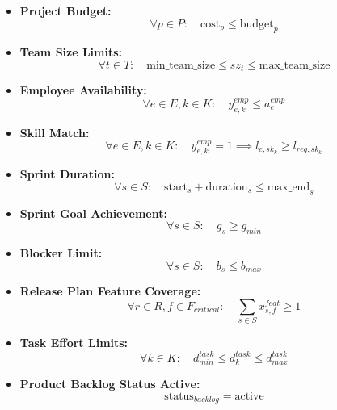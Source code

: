 \documentclass{article}
\begin{document}
\begin{itemize}
\item \textbf{Project Budget:}
\[
\forall p \in P: \quad \text{cost}_p \leq \text{budget}_p
\]

\item \textbf{Team Size Limits:}
\[
\forall t \in T: \quad \text{min\_team\_size} \leq sz_t \leq \text{max\_team\_size}
\]

\item \textbf{Employee Availability:}
\[
\forall e \in E, k \in K: \quad y^{emp}_{e,k} \leq a^{emp}_e
\]

\item \textbf{Skill Match:}
\[
\forall e \in E, k \in K: \quad y^{emp}_{e,k} = 1 \implies l_{e,sk_k} \geq l_{req,sk_k}
\]

\item \textbf{Sprint Duration:}
\[
\forall s \in S: \quad \text{start}_s + \text{duration}_s \leq \text{max\_end}_s
\]

\item \textbf{Sprint Goal Achievement:}
\[
\forall s \in S: \quad g_s \geq g_{min}
\]

\item \textbf{Blocker Limit:}
\[
\forall s \in S: \quad b_s \leq b_{max}
\]

\item \textbf{Release Plan Feature Coverage:}
\[
\forall r \in R, f \in F_{critical}: \quad \sum_{s \in S} x^{feat}_{s,f} \geq 1
\]

\item \textbf{Task Effort Limits:}
\[
\forall k \in K: \quad d^{task}_{min} \leq d^{task}_k \leq d^{task}_{max}
\]

\item \textbf{Product Backlog Status Active:}
\[
\text{status}_{backlog} = \text{active}
\]

\end{itemize}
\end{document}
